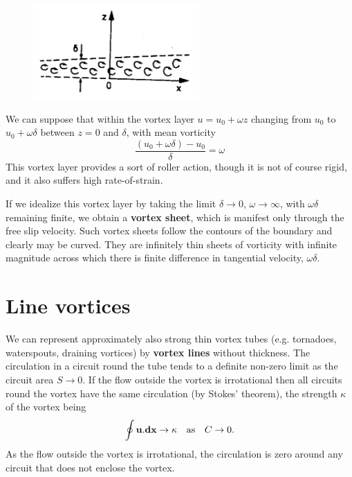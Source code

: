 \documentclass[10pt]{report}
\begin{document}
\begin{figure}
\centerline{\includegraphics[width=2.5in]{Section47.pdf}}
\caption{ }
\label{fig3.7}
\end{figure}

We can suppose that within the vortex layer $u = u_{0}+\omega z$ changing
from $u_{0}$ to $u_{0}+\omega \delta $ between $ z = 0$ and $\delta $,
with mean vorticity
\[
\frac{\left( {u_0 +\omega \delta } \right)-u_0 }{\delta }=\omega
\]
This vortex layer provides a sort of roller action, though it is not of
course rigid, and it also suffers high rate-of-strain.

If we idealize this vortex layer by taking the limit $\delta \to  0$,
$\omega  \to \infty $, with $\omega \delta $ remaining finite, we
obtain a \textbf{vortex sheet}, which is manifest only through the free slip
velocity. Such vortex sheets follow the contours of the boundary and clearly
may be curved. They are infinitely thin sheets of vorticity with infinite
magnitude across which there is finite difference in tangential velocity,
$\omega \delta $.

\section{Line vortices}
We can represent approximately also strong thin vortex tubes (e.g.
tornadoes, waterspouts, draining vortices) by \textbf{vortex lines} without
thickness. The circulation in a circuit round the tube tends to a definite
non-zero limit as the circuit area $S \to 0$. If the flow outside the
vortex is irrotational then all circuits round the vortex have the same
circulation (by Stokes' theorem), the strength $\kappa $ of the vortex being
\[\oint {{{\bf u}}. {{\bf dx}}} \to \kappa \quad\hbox{as}\quad C \to  0 . \]
As the flow outside the vortex is irrotational, the circulation is zero
around any circuit that does not enclose the vortex.
\end{document}

